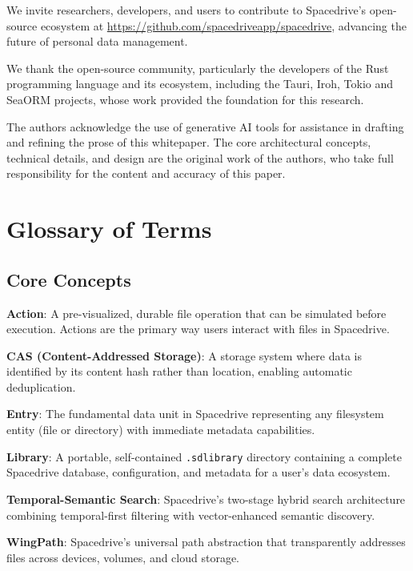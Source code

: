 \documentclass[sigconf]{acmart}
\begin{document}
We invite researchers, developers, and users to contribute to Spacedrive's open-source ecosystem at \url{https://github.com/spacedriveapp/spacedrive}, advancing the future of personal data management.


\begin{acks}
We thank the open-source community, particularly the developers of the Rust programming language and its ecosystem, including the Tauri, Iroh, Tokio and SeaORM projects, whose work provided the foundation for this research.

The authors acknowledge the use of generative AI tools for assistance in drafting and refining the prose of this whitepaper. The core architectural concepts, technical details, and design are the original work of the authors, who take full responsibility for the content and accuracy of this paper.
\end{acks}


\appendix
\section{Glossary of Terms}

\subsection*{Core Concepts}

\textbf{Action}: A pre-visualized, durable file operation that can be simulated before execution. Actions are the primary way users interact with files in Spacedrive.

\textbf{CAS (Content-Addressed Storage)}: A storage system where data is identified by its content hash rather than location, enabling automatic deduplication.

\textbf{Entry}: The fundamental data unit in Spacedrive representing any filesystem entity (file or directory) with immediate metadata capabilities.

\textbf{Library}: A portable, self-contained \texttt{.sdlibrary} directory containing a complete Spacedrive database, configuration, and metadata for a user's data ecosystem.

\textbf{Temporal-Semantic Search}: Spacedrive's two-stage hybrid search architecture combining temporal-first filtering with vector-enhanced semantic discovery.

\textbf{WingPath}: Spacedrive's universal path abstraction that transparently addresses files across devices, volumes, and cloud storage.
\end{document}
